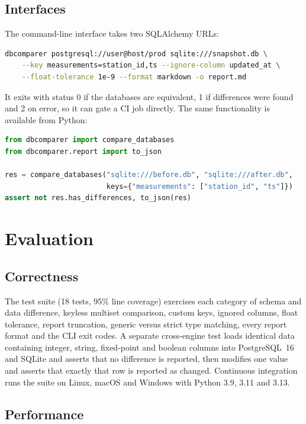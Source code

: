 \documentclass[11pt]{article}
\begin{document}
\subsection{Interfaces}

The command-line interface takes two SQLAlchemy URLs:

\begin{lstlisting}[language=bash]
dbcomparer postgresql://user@host/prod sqlite:///snapshot.db \
    --key measurements=station_id,ts --ignore-column updated_at \
    --float-tolerance 1e-9 --format markdown -o report.md
\end{lstlisting}

It exits with status 0 if the databases are equivalent, 1 if differences
were found and 2 on error, so it can gate a CI job directly. The same
functionality is available from Python:

\begin{lstlisting}[language=Python]
from dbcomparer import compare_databases
from dbcomparer.report import to_json

res = compare_databases("sqlite:///before.db", "sqlite:///after.db",
                        keys={"measurements": ["station_id", "ts"]})
assert not res.has_differences, to_json(res)
\end{lstlisting}

\section{Evaluation}

\subsection{Correctness}

The test suite (18 tests, 95\% line coverage) exercises each category of
schema and data difference, keyless multiset comparison, custom keys,
ignored columns, float tolerance, report truncation, generic versus strict
type matching, every report format and the CLI exit codes. A separate
cross-engine test loads identical data containing integer, string,
fixed-point and boolean columns into PostgreSQL~16 and SQLite and asserts
that no difference is reported, then modifies one value and asserts that
exactly that row is reported as changed. Continuous integration runs the
suite on Linux, macOS and Windows with Python 3.9, 3.11 and 3.13.

\subsection{Performance}
\end{document}

